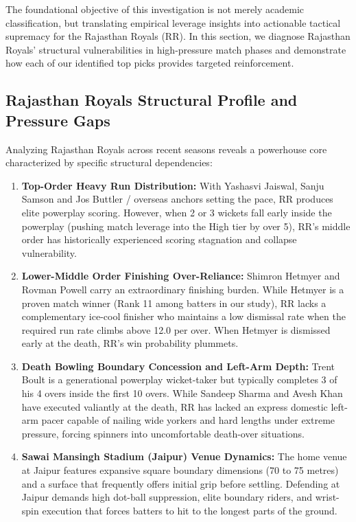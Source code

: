 \documentclass[11pt,a4paper]{article}
\begin{document}
The foundational objective of this investigation is not merely academic classification, but translating empirical leverage insights into actionable tactical supremacy for the Rajasthan Royals (RR). In this section, we diagnose Rajasthan Royals' structural vulnerabilities in high-pressure match phases and demonstrate how each of our identified top picks provides targeted reinforcement.

\subsection{Rajasthan Royals Structural Profile and Pressure Gaps}
Analyzing Rajasthan Royals across recent seasons reveals a powerhouse core characterized by specific structural dependencies:
\begin{enumerate}
    \item \textbf{Top-Order Heavy Run Distribution:} With Yashasvi Jaiswal, Sanju Samson and Jos Buttler / overseas anchors setting the pace, RR produces elite powerplay scoring. However, when 2 or 3 wickets fall early inside the powerplay (pushing match leverage into the High tier by over 5), RR's middle order has historically experienced scoring stagnation and collapse vulnerability.
    \item \textbf{Lower-Middle Order Finishing Over-Reliance:} Shimron Hetmyer and Rovman Powell carry an extraordinary finishing burden. While Hetmyer is a proven match winner (Rank 11 among batters in our study), RR lacks a complementary ice-cool finisher who maintains a low dismissal rate when the required run rate climbs above 12.0 per over. When Hetmyer is dismissed early at the death, RR's win probability plummets.
    \item \textbf{Death Bowling Boundary Concession and Left-Arm Depth:} Trent Boult is a generational powerplay wicket-taker but typically completes 3 of his 4 overs inside the first 10 overs. While Sandeep Sharma and Avesh Khan have executed valiantly at the death, RR has lacked an express domestic left-arm pacer capable of nailing wide yorkers and hard lengths under extreme pressure, forcing spinners into uncomfortable death-over situations.
    \item \textbf{Sawai Mansingh Stadium (Jaipur) Venue Dynamics:} The home venue at Jaipur features expansive square boundary dimensions (70 to 75 metres) and a surface that frequently offers initial grip before settling. Defending at Jaipur demands high dot-ball suppression, elite boundary riders, and wrist-spin execution that forces batters to hit to the longest parts of the ground.
\end{enumerate}
\end{document}
